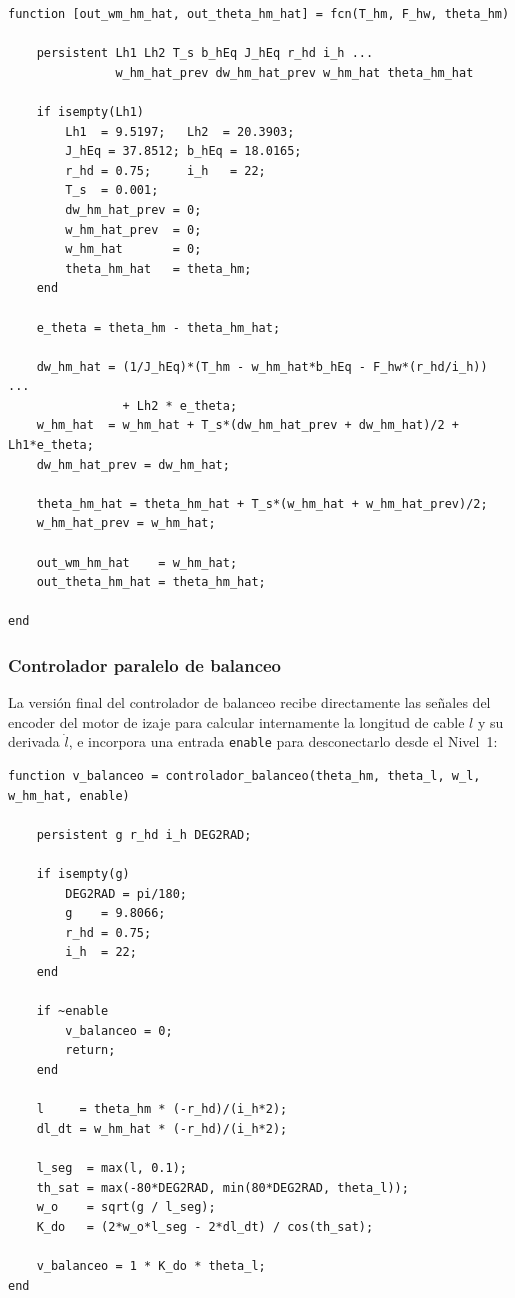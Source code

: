 \documentclass[12pt, a4paper]{article}
\begin{document}
\begin{lstlisting}[style=matlab, basicstyle=\ttfamily\scriptsize, caption={MATLAB Function: observador de Luenberger del izaje ($T_{s2}=1$\,ms).}, label=lst:obs-izaje]
function [out_wm_hm_hat, out_theta_hm_hat] = fcn(T_hm, F_hw, theta_hm)

    persistent Lh1 Lh2 T_s b_hEq J_hEq r_hd i_h ...
               w_hm_hat_prev dw_hm_hat_prev w_hm_hat theta_hm_hat

    if isempty(Lh1)
        Lh1  = 9.5197;   Lh2  = 20.3903;
        J_hEq = 37.8512; b_hEq = 18.0165;
        r_hd = 0.75;     i_h   = 22;
        T_s  = 0.001;
        dw_hm_hat_prev = 0;
        w_hm_hat_prev  = 0;
        w_hm_hat       = 0;
        theta_hm_hat   = theta_hm;
    end

    e_theta = theta_hm - theta_hm_hat;

    dw_hm_hat = (1/J_hEq)*(T_hm - w_hm_hat*b_hEq - F_hw*(r_hd/i_h)) ...
                + Lh2 * e_theta;
    w_hm_hat  = w_hm_hat + T_s*(dw_hm_hat_prev + dw_hm_hat)/2 + Lh1*e_theta;
    dw_hm_hat_prev = dw_hm_hat;

    theta_hm_hat = theta_hm_hat + T_s*(w_hm_hat + w_hm_hat_prev)/2;
    w_hm_hat_prev = w_hm_hat;

    out_wm_hm_hat    = w_hm_hat;
    out_theta_hm_hat = theta_hm_hat;

end
\end{lstlisting}

\subsubsection{Controlador paralelo de balanceo}

La versión final del controlador de balanceo recibe directamente las señales del encoder
del motor de izaje para calcular internamente la longitud de cable $l$ y su derivada
$\dot{l}$, e incorpora una entrada \texttt{enable} para desconectarlo desde el Nivel~1:

\begin{lstlisting}[style=matlab, basicstyle=\ttfamily\scriptsize, caption={MATLAB Function: controlador paralelo de balanceo ($T_{s2}=1$\,ms).}, label=lst:ctrl-balanceo-final]
function v_balanceo = controlador_balanceo(theta_hm, theta_l, w_l, w_hm_hat, enable)

    persistent g r_hd i_h DEG2RAD;

    if isempty(g)
        DEG2RAD = pi/180;
        g    = 9.8066;
        r_hd = 0.75;
        i_h  = 22;
    end

    if ~enable
        v_balanceo = 0;
        return;
    end

    l     = theta_hm * (-r_hd)/(i_h*2);
    dl_dt = w_hm_hat * (-r_hd)/(i_h*2);

    l_seg  = max(l, 0.1);
    th_sat = max(-80*DEG2RAD, min(80*DEG2RAD, theta_l));
    w_o    = sqrt(g / l_seg);
    K_do   = (2*w_o*l_seg - 2*dl_dt) / cos(th_sat);

    v_balanceo = 1 * K_do * theta_l;
end
\end{lstlisting}
\end{document}
